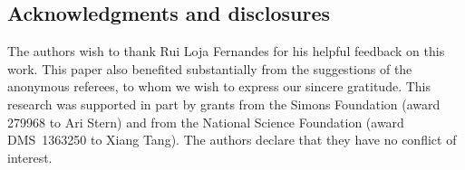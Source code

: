 \documentclass[pdftex]{sigma}
\numberwithin{equation}{section}
\begin{document}
\subsection*{Acknowledgments and disclosures}
The authors wish to thank Rui Loja Fernandes for his helpful feedback on this work. This paper also benef\/ited substantially from the suggestions of the anonymous referees, to whom we wish to express our sincere gratitude.
This research was supported in part by grants from the Simons Foundation (award 279968 to Ari Stern) and from the National Science Foundation (award DMS~1363250 to Xiang Tang).
The authors declare that they have no conf\/lict of interest.
\end{document}
